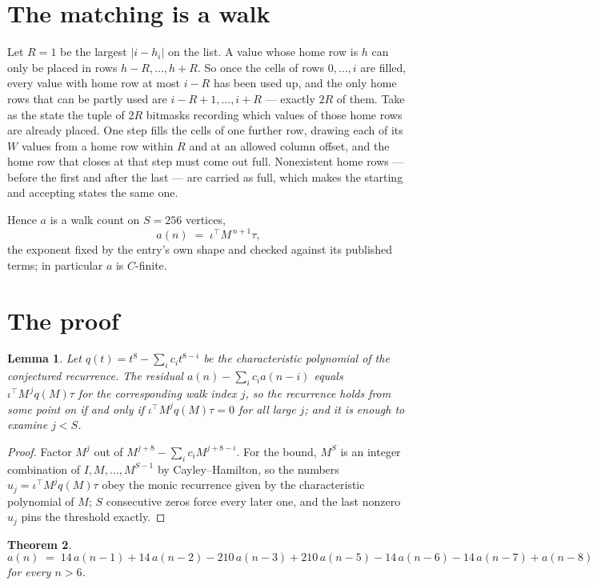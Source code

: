 \documentclass[11pt,a4paper]{article}
\theoremstyle{plain}
\newtheorem{theorem}{Theorem}
\newtheorem{lemma}[theorem]{Lemma}
\theoremstyle{definition}
\begin{document}
\section{The matching is a walk}

Let $R=1$ be the largest $|i-h_i|$ on the list. A value whose home row is $h$ can only be
placed in rows $h-R,\dots,h+R$. So once the cells of rows $0,\dots,i$ are filled, every
value with home row at most $i-R$ has been used up, and the only home rows that can be
partly used are $i-R+1,\dots,i+R$ --- exactly $2R$ of them. Take as the state the tuple of
$2R$ bitmasks recording which values of those home rows are already placed. One step fills
the cells of one further row, drawing each of its $W$ values from a home row within $R$
and at an allowed column offset, and the home row that closes at that step must come out
full. Nonexistent home rows --- before the first and after the last --- are carried as
full, which makes the starting and accepting states the same one.

Hence $a$ is a walk count on $S=256$ vertices,
\[
a(n)\;=\;\iota^{\!\top}M^{\,n+1}\tau ,
\]
the exponent fixed by the entry's own shape and checked against its published terms; in
particular $a$ is $C$-finite.

\section{The proof}

\begin{lemma}\label{lem:crit}
Let $q(t)=t^{8}-\sum_i c_it^{8-i}$ be the characteristic polynomial of the
conjectured recurrence. The residual $a(n)-\sum_ic_ia(n-i)$ equals
$\iota^{\!\top}M^{\,j}q(M)\tau$ for the corresponding walk index $j$, so the recurrence
holds from some point on if and only if $\iota^{\!\top}M^{j}q(M)\tau=0$ for all large $j$;
and it is enough to examine $j<S$.
\end{lemma}

\begin{proof}
Factor $M^{j}$ out of $M^{j+8}-\sum_ic_iM^{j+8-i}$. For the bound, $M^{S}$
is an integer combination of $I,M,\dots,M^{S-1}$ by Cayley--Hamilton, so the numbers
$u_j=\iota^{\!\top}M^{j}q(M)\tau$ obey the monic recurrence given by the characteristic
polynomial of $M$; $S$ consecutive zeros force every later one, and the last nonzero $u_j$
pins the threshold exactly.
\end{proof}

\begin{theorem}
\[
a(n)\;=\;14\,a(n-1) + 14\,a(n-2) - 210\,a(n-3) + 210\,a(n-5) - 14\,a(n-6) - 14\,a(n-7) + a(n-8)
\]
for every $n>6$.
\end{theorem}
\end{document}
